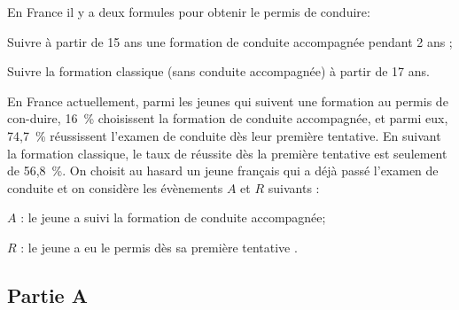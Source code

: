 \begin{list}{\textbullet}{En France il y a deux formules pour obtenir le permis de conduire:}
			\item Suivre à partir de 15 ans une formation de conduite accompagnée pendant 2 ans ;
		\item Suivre la formation classique (sans conduite accompagnée) à partir de 17 ans.
	\end{list}

	

	En France actuellement, parmi les jeunes qui suivent une formation au permis de con-duire, 16~\% choisissent la formation de conduite accompagnée, et parmi eux, 74,7~\% réussissent l'examen de conduite dès leur première tentative.
	En suivant la formation classique, le taux de réussite dès la première tentative est seulement de 56,8~\%.
	On choisit au hasard un jeune français qui a déjà passé l'examen de conduite et on considère les évènements $A$ et $R$ suivants :

	\begin{list}{\textbullet}{}
		\item $A$ : \og le jeune a suivi la formation de conduite accompagnée\fg{};
		\item $R$ : \og le jeune a eu le permis dès sa première tentative \fg{}.
	\end{list}







	\subsection*{Partie A}


